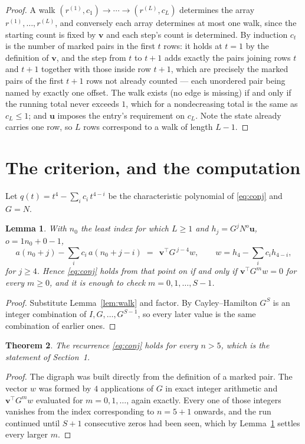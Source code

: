 \documentclass[11pt,a4paper]{article}
\theoremstyle{plain}
\newtheorem{theorem}{Theorem}
\newtheorem{lemma}[theorem]{Lemma}
\theoremstyle{definition}
\begin{document}
\begin{proof}
A walk $(r^{(1)},c_1)\to\cdots\to(r^{(L)},c_L)$ determines the array
$r^{(1)},\dots,r^{(L)}$, and conversely each array determines at most one walk, since the
starting count is fixed by $\mathbf{v}$ and each step's count is determined. By induction
$c_t$ is the number of marked pairs in the first $t$ rows: it holds at $t=1$ by the
definition of $\mathbf{v}$, and the step from $t$ to $t+1$ adds exactly the pairs joining
rows $t$ and $t+1$ together with those inside row $t+1$, which are precisely the marked
pairs of the first $t+1$ rows not already counted --- each unordered pair being named by
exactly one offset. The walk exists (no edge is missing) if and only if the running total
never exceeds $1$, which for a nondecreasing total is the same as $c_L\le1$; and
$\mathbf{u}$ imposes the entry's requirement on $c_L$. Note the state already carries one
row, so $L$ rows correspond to a walk of length $L-1$.
\end{proof}

\section{The criterion, and the computation}

Let $q(t)=t^{4}-\sum_i c_i\,t^{4-i}$ be the characteristic polynomial of
\eqref{eq:conj} and $G=N$.

\begin{lemma}\label{lem:crit}
With $n_0$ the least index for which $L\ge1$ and $h_j=G^{j}N^{o}\mathbf{u}$,
$o=1n_0+0-1$,
\[
a(n_0+j)-\sum_i c_i\,a(n_0+j-i)\;=\;\,\mathbf{v}^{\!\top}G^{\,j-4}w,
\qquad w=h_{4}-\sum_i c_i h_{4-i},
\]
for $j\ge4$. Hence \eqref{eq:conj} holds from that point on if and only if
$\mathbf{v}^{\!\top}G^{m}w=0$ for every $m\ge0$, and it is enough to check
$m=0,1,\dots,S-1$.
\end{lemma}

\begin{proof}
Substitute Lemma~\ref{lem:walk} and factor. By Cayley--Hamilton $G^{S}$ is an integer
combination of $I,G,\dots,G^{S-1}$, so every later value is the same combination of earlier
ones.
\end{proof}

\begin{theorem}
The recurrence \eqref{eq:conj} holds for every $n>5$, which is the statement of
Section~1.
\end{theorem}

\begin{proof}
The digraph was built directly from the definition of a marked pair. The vector $w$ was
formed by $4$ applications of $G$ in exact integer arithmetic and
$\mathbf{v}^{\!\top}G^{m}w$ evaluated for $m=0,1,\dots$, again exactly. Every one of
those integers vanishes from the index corresponding to $n=5+1$ onwards, and the run
continued until $S+1$ consecutive zeros had been seen, which by Lemma~\ref{lem:crit}
settles every larger $m$.
\end{proof}
\end{document}
